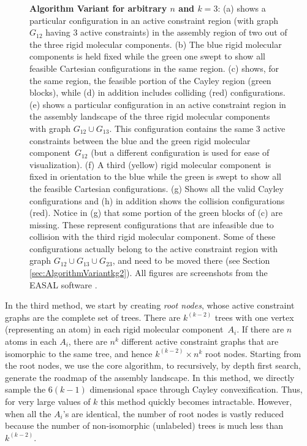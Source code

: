 \documentclass[]{article}
\newcommand{\rmc}{rigid molecular component}
\begin{document}
\begin{figure}[htbp]
\centering
{}

\caption{ \scriptsize \textbf{Algorithm Variant for arbitrary $n$ and $k=3$}:
(a) shows a particular configuration in an active constraint region
(with graph $G_{12}$ having 3 active constraints)
in the assembly region of two out of the three \rmc s.
(b) The blue \rmc s is held fixed while the green one swept to show
all feasible Cartesian configurations in the same region.
(c) shows, for the same region, the feasible portion of the Cayley region 
(green blocks), while (d) in addition includes colliding (red) configurations. 
(e) shows a particular configuration in an active constraint region
in the assembly landscape of the three \rmc s with graph $G_{12} \cup G_{13}$.
This configuration contains 
the same 3 active constraints between the blue and the green \rmc\ $G_{12}$
(but a different configuration is used for ease of visualization).
(f) A third (yellow) \rmc\ is fixed in orientation to the blue while the green is
swept to show all the feasible Cartesian configurations. 
(g) Shows all the valid Cayley configurations and (h) in addition shows the
collision configurations (red).
Notice in (g) that some portion of the green blocks of (c) are missing. These represent
configurations that are infeasible due to collision with the third \rmc.
Some of these configurations actually belong to the active constraint region with
graph $G_{12} \cup G_{13} \cup G_{23}$, and need to be moved there
(see Section \ref{sec:AlgorithmVariantkg2}).
All figures are screenshots from the EASAL software 
\cite{easalVideo,easalSoftware,Ozkan:toms}.
}
\label{fig:ss23mol}
\end{figure}

In the third method, we start by creating \emph{root nodes}, whose active
constraint graphs are the complete set of trees. There are $k^{(k-2)}$ trees
with one vertex (representing an atom) in each \rmc\ $A_i$. If there are $n$
atoms in each $A_i$, there are $n^k$ different active constraint graphs that
are isomorphic to the same tree, and hence $k^{(k-2)} \times n^k$ root nodes.
Starting from the root nodes, we use the core algorithm, to recursively, by
depth first search, generate the roadmap of the assembly landscape.  In this
method, we directly sample the $6(k-1)$ dimensional space through Cayley
convexification. Thus, for very large values of $k$ this method quickly becomes
intractable. However, when all the $A_i$'s are identical, the number of root
nodes is vastly reduced because the number of non-isomorphic (unlabeled) trees
is much less than $k^{(k-2)}$.
\end{document}
